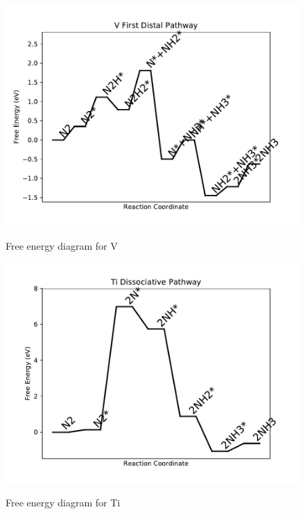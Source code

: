 \documentclass{article}
\begin{document}
\newpage
\begin{figure}
\includegraphics[width=1\linewidth]{data/plots/V_distal_1.pdf}
\label{fig:V_distal_1}
\caption{Free energy diagram for V}
\end{figure}

\begin{figure}
\includegraphics[width=1\linewidth]{data/plots/Ti_dissociative.pdf}
\label{fig:Ti_dissociative}
\caption{Free energy diagram for Ti}
\end{figure}
\end{document}
